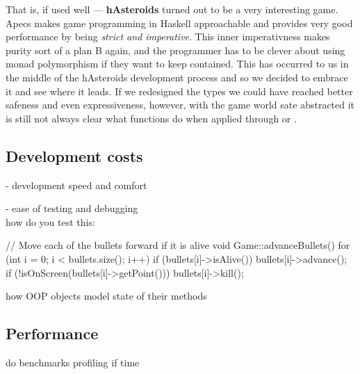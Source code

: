 \documentclass[
  digital, %
  color,   %
  table,   %
  oneside, %
  lof,     %
  lot,     %
]{fithesis3}
\newcommand{\vs}{vs.\ }
\begin{document}
{That is, if used well --- \textbf{hAsteroids} turned out to be a very interesting game.
Apecs makes game programming in Haskell approachable and provides
very good performance by being \emph{strict and imperative}. This inner imperativness
makes purity sort of a plan B again, and the programmer has to be clever about using monad polymorphism
if they want to keep  contained. This has occurred to us in the middle
of the hAsteroids development process and so we decided to embrace it and see where it leads.
If we redesigned the types we could have reached better safeness and even expressiveness, however,
with the game world sate abstracted it is still not always clear what functions do
when applied through  or .



\subsection{Development costs}

- development speed and comfort

- ease of testing and debugging\\
how do you test this:
\begin{cppblock}
// Move each of the bullets forward if it is alive
void Game::advanceBullets() {
    for (int i = 0; i < bullets.size(); i++) {
        if (bullets[i]->isAlive()) {
            bullets[i]->advance();
            if (!isOnScreen(bullets[i]->getPoint())) {
                bullets[i]->kill();
            }
        }
    }
}
\end{cppblock}
how OOP objects model state of their methods

\subsection{Performance}

do benchmarks profiling if time





}
\end{document}
